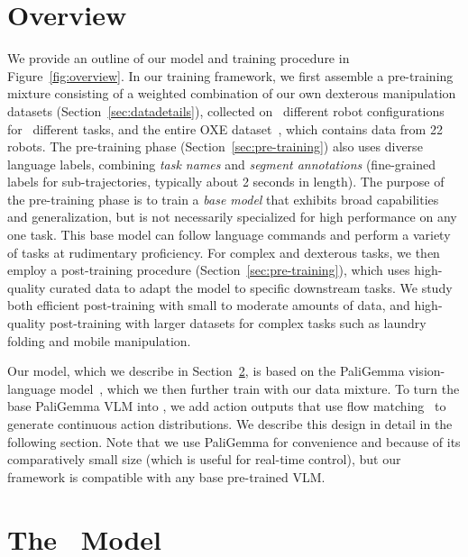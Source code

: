 \section{Overview}
\label{sec:overview}

We provide an outline of our model and training procedure in Figure~\ref{fig:overview}. In our training framework, we first assemble a pre-training mixture consisting of a weighted combination of our own dexterous manipulation datasets (Section~\ref{sec:datadetails}), collected on \Robots\ different robot configurations for \Tasks\ different tasks, and the entire OXE dataset~\citep{collaboration2023open}, which contains data from 22 robots. The pre-training phase (Section~\ref{sec:pre-training}) also uses diverse language labels, combining \emph{task names} and \emph{segment annotations} (fine-grained labels for sub-trajectories, typically about 2 seconds in length). The purpose of the pre-training phase is to train a \emph{base model} that exhibits broad capabilities and generalization, but is not necessarily specialized for high performance on any one task. This base model can follow language commands and perform a variety of tasks at rudimentary proficiency. For complex and dexterous tasks, we then employ a post-training procedure (Section~\ref{sec:pre-training}), which uses high-quality curated data to adapt the model to specific downstream tasks. We study both efficient post-training with small to moderate amounts of data, and high-quality post-training with larger datasets for complex tasks such as laundry folding and mobile manipulation.

Our model, which we describe in Section~\ref{sec:model}, is based on the PaliGemma vision-language model~\citep{beyer2024paligemma}, which we then further train with our data mixture. To turn the base PaliGemma VLM into \ModelSymbol, we add action outputs that use flow matching~\citep{liu2022rectified, lipman2022flow} to generate continuous action distributions. We describe this design in detail in the following section. Note that we use PaliGemma for convenience and because of its comparatively small size (which is useful for real-time control), but our framework is compatible with any base pre-trained VLM.

\section{The \ModelSymbol\ Model}
\label{sec:model}

